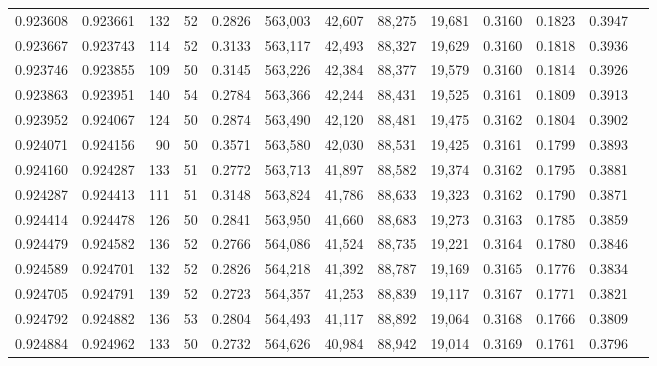 \begin{tabular}{rrrrrrrrrrrrr}
0.923608 & 0.923661 &   132 &  52 &                                     0.2826 & 563,003 &  42,607 &  88,275 &  19,681 & 0.3160 & 0.1823 & 0.3947 \\
0.923667 & 0.923743 &   114 &  52 &                                     0.3133 & 563,117 &  42,493 &  88,327 &  19,629 & 0.3160 & 0.1818 & 0.3936 \\
0.923746 & 0.923855 &   109 &  50 &                                     0.3145 & 563,226 &  42,384 &  88,377 &  19,579 & 0.3160 & 0.1814 & 0.3926 \\
0.923863 & 0.923951 &   140 &  54 &                                     0.2784 & 563,366 &  42,244 &  88,431 &  19,525 & 0.3161 & 0.1809 & 0.3913 \\
0.923952 & 0.924067 &   124 &  50 &                                     0.2874 & 563,490 &  42,120 &  88,481 &  19,475 & 0.3162 & 0.1804 & 0.3902 \\
0.924071 & 0.924156 &    90 &  50 &                                     0.3571 & 563,580 &  42,030 &  88,531 &  19,425 & 0.3161 & 0.1799 & 0.3893 \\
0.924160 & 0.924287 &   133 &  51 &                                     0.2772 & 563,713 &  41,897 &  88,582 &  19,374 & 0.3162 & 0.1795 & 0.3881 \\
0.924287 & 0.924413 &   111 &  51 &                                     0.3148 & 563,824 &  41,786 &  88,633 &  19,323 & 0.3162 & 0.1790 & 0.3871 \\
0.924414 & 0.924478 &   126 &  50 &                                     0.2841 & 563,950 &  41,660 &  88,683 &  19,273 & 0.3163 & 0.1785 & 0.3859 \\
0.924479 & 0.924582 &   136 &  52 &                                     0.2766 & 564,086 &  41,524 &  88,735 &  19,221 & 0.3164 & 0.1780 & 0.3846 \\
0.924589 & 0.924701 &   132 &  52 &                                     0.2826 & 564,218 &  41,392 &  88,787 &  19,169 & 0.3165 & 0.1776 & 0.3834 \\
0.924705 & 0.924791 &   139 &  52 &                                     0.2723 & 564,357 &  41,253 &  88,839 &  19,117 & 0.3167 & 0.1771 & 0.3821 \\
0.924792 & 0.924882 &   136 &  53 &                                     0.2804 & 564,493 &  41,117 &  88,892 &  19,064 & 0.3168 & 0.1766 & 0.3809 \\
0.924884 & 0.924962 &   133 &  50 &                                     0.2732 & 564,626 &  40,984 &  88,942 &  19,014 & 0.3169 & 0.1761 & 0.3796 \\

\end{tabular}
